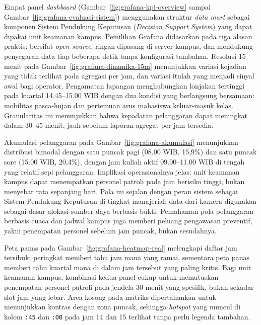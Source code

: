 Empat panel \textit{dashboard} (Gambar~\ref{fig:grafana-kpi-overview} sampai Gambar~\ref{fig:grafana-evaluasi-sistem}) menggunakan struktur \textit{data mart} sebagai komponen Sistem Pendukung Keputusan (\textit{Decision Support System}) yang dapat dipakai unit keamanan kampus. Pemilihan Grafana didasarkan pada tiga alasan praktis: bersifat \textit{open source}, ringan dipasang di server kampus, dan mendukung penyegaran data tiap beberapa detik tanpa konfigurasi tambahan. Resolusi 15 menit pada Gambar~\ref{fig:grafana-dinamika-15m} menunjukkan variasi kejadian yang tidak terlihat pada agregasi per jam, dan variasi itulah yang menjadi sinyal awal bagi operator. Pengamatan lapangan menghubungkan lonjakan tertinggi pada kuartal 14.45--15.00 WIB dengan dua kondisi yang berlangsung bersamaan: mobilitas pasca-hujan dan pertemuan arus mahasiswa keluar-masuk kelas. Granularitas ini menunjukkan bahwa kepadatan pelanggaran dapat meningkat dalam 30--45 menit, jauh sebelum laporan agregat per jam tersedia.

Akumulasi pelanggaran pada Gambar~\ref{fig:grafana-akumulasi} menunjukkan distribusi bimodal dengan satu puncak pagi (08.00 WIB, 15,9\%) dan satu puncak sore (15.00 WIB, 20,4\%), dengan jam kuliah aktif 09.00--11.00 WIB di tengah yang relatif sepi pelanggaran. Implikasi operasionalnya jelas: unit keamanan kampus dapat menempatkan personel patroli pada jam berisiko tinggi, bukan menyebar rata sepanjang hari. Pola ini sejalan dengan peran sistem sebagai Sistem Pendukung Keputusan di tingkat manajerial: data dari kamera digunakan sebagai dasar alokasi sumber daya berbasis bukti. Pemahaman pola pelanggaran berbasis cuaca dan jadwal kampus juga memberi peluang pengawasan preventif, yakni penempatan personel sebelum jam puncak, bukan sesudahnya.

Peta panas pada Gambar~\ref{fig:grafana-heatmap-real} melengkapi daftar jam tersibuk: peringkat memberi tahu jam mana yang ramai, sementara peta panas memberi tahu kuartal mana di dalam jam tersebut yang paling kritis. Bagi unit keamanan kampus, kombinasi kedua panel cukup untuk memutuskan penempatan personel patroli pada jendela 30 menit yang spesifik, bukan sekadar slot jam yang lebar. Area kosong pada matriks dipertahankan untuk menunjukkan kontras dengan zona puncak, sehingga \textit{hotspot} yang muncul di kolom \texttt{:45} dan \texttt{:00} pada jam 14 dan 15 terlihat tanpa perlu legenda tambahan.

